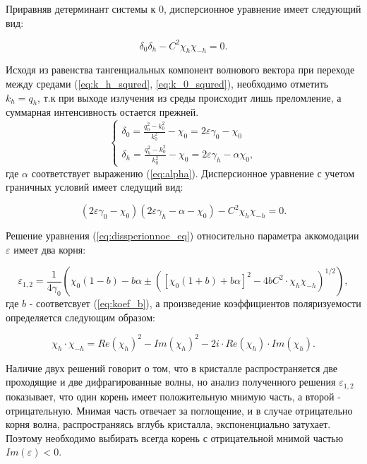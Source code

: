 Приравняв детерминант системы к 0, дисперсионное уравнение имеет следующий вид:

\begin{equation}
   \delta_0 \delta_h -C^2 \chi_h \chi_{-h} = 0.
\end{equation}

Исходя из равенства тангенциальных компонент волнового вектора при переходе
 между средами (\ref{eq:k_h_squred}, \ref{eq:k_0_squred}),
необходимо отметить $k_h = q_h$, т.к при выходе излучения из среды происходит
лишь преломление, а суммарная интенсивность остается прежней.
\begin{equation}
 \begin{cases}
   \delta_0 = \frac{q_0^2 - k_0^2}{k_0^2} - \chi_0 = 2\varepsilon\gamma_0 - \chi_0
   \\
   \delta_h = \frac{q_h^2 - k_0^2}{k_0^2} - \chi_0 = 2\varepsilon\gamma_h - \alpha \chi_0,
 \end{cases}
\end{equation}
\noindent
где $\alpha$ соответствует выражению (\ref{eq:alpha}). Дисперсионное уравнение
с учетом граничных условий имеет следущий вид:

\begin{equation}
   (2\varepsilon \gamma_0 - \chi_0)(2\varepsilon \gamma_h - \alpha - \chi_0) - C^2 \chi_h\chi_{-h} = 0.
   \label{eq:dissperionnoe_eq}
\end{equation}

Решение уравнения (\ref{eq:dissperionnoe_eq}) относительно параметра аккомодации $\varepsilon$ имеет два корня:

\begin{equation}
   \varepsilon_{1,2} = \frac{1}{4\gamma_0} \left( \chi_0 (1-b) - b\alpha \pm \left( [\chi_0(1+b)+b\alpha]^2 - 4bC^2 \cdot \chi_{h}\chi_{-h} \right)^{1/2} \right),
\end{equation}
\noindent
где $b$ - соответсвует (\ref{eq:koef_b}),  а произведение коэффициентов
 поляризуемости определяется следующим образом:

 $$\chi_{h} \cdot \chi_{-h} = Re(\chi_{h})^2-Im(\chi_{h})^2 - 2i \cdot Re(\chi_{h}) \cdot Im(\chi_{h}).$$

Наличие двух решений говорит о том, что в кристалле распространяется две проходящие и две дифрагированные волны, но
анализ полученного решения $ \varepsilon_{1,2}$ показывает, что один корень имеет положительную мнимую часть, а второй -
отрицательную. Мнимая часть отвечает за поглощение, и в случае отрицательно корня волна, распространяясь
вглубь кристалла, экспоненциально затухает. Поэтому необходимо выбирать всегда корень с отрицательной мнимой частью
$Im(\varepsilon)<0$.

